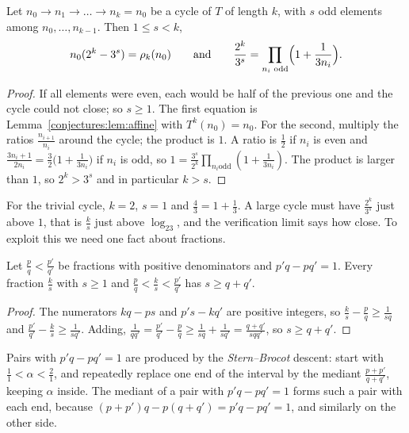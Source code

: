 \begin{proposition}\label{conjectures:prop:cycle}
Let $n_0\to n_1\to\dots\to n_k=n_0$ be a cycle of $T$ of length $k$, with $s$ odd elements among $n_0,\dots,n_{k-1}$. Then $1\le s<k$,
\[
n_0(2^k-3^s)=\rho_k(n_0)\qquad\text{and}\qquad\frac{2^k}{3^s}=\prod_{n_i\text{ odd}}\Bigl(1+\frac1{3n_i}\Bigr).
\]
\end{proposition}
\begin{proof}
If all elements were even, each would be half of the previous one and the cycle could not close; so $s\ge1$. The first equation is
Lemma~\ref{conjectures:lem:affine} with $T^k(n_0)=n_0$. For the second, multiply the ratios $\frac{n_{i+1}}{n_i}$ around the cycle; the product is $1$. A ratio is
$\frac12$ if $n_i$ is even and $\frac{3n_i+1}{2n_i}=\frac32\bigl(1+\frac1{3n_i}\bigr)$ if $n_i$ is odd, so $1=\frac{3^s}{2^k}\prod_{n_i\text{
odd}}(1+\frac1{3n_i})$. The product is larger than $1$, so $2^k>3^s$ and in particular $k>s$.
\end{proof}

For the trivial cycle, $k=2$, $s=1$ and $\frac43=1+\frac13$. A large cycle must have $\frac{2^k}{3^s}$ just above $1$, that is $\frac ks$ just above
$\log_23$, and the verification limit says how close. To exploit this we need one fact about fractions.

\begin{lemma}\label{conjectures:lem:farey}
Let $\frac pq<\frac{p'}{q'}$ be fractions with positive denominators and $p'q-pq'=1$. Every fraction $\frac ks$ with $s\ge1$ and
$\frac pq<\frac ks<\frac{p'}{q'}$ has $s\ge q+q'$.
\end{lemma}
\begin{proof}
The numerators $kq-ps$ and $p's-kq'$ are positive integers, so $\frac ks-\frac pq\ge\frac1{sq}$ and $\frac{p'}{q'}-\frac ks\ge\frac1{sq'}$. Adding,
$\frac1{qq'}=\frac{p'}{q'}-\frac pq\ge\frac1{sq}+\frac1{sq'}=\frac{q+q'}{sqq'}$, so $s\ge q+q'$.
\end{proof}

Pairs with $p'q-pq'=1$ are produced by the \emph{Stern--Brocot} descent: start with $\frac11<\alpha<\frac21$, and repeatedly replace one end of the
interval by the mediant $\frac{p+p'}{q+q'}$, keeping $\alpha$ inside. The mediant of a pair with $p'q-pq'=1$ forms such a pair with each end, because
$(p+p')q-p(q+q')=p'q-pq'=1$, and similarly on the other side.

